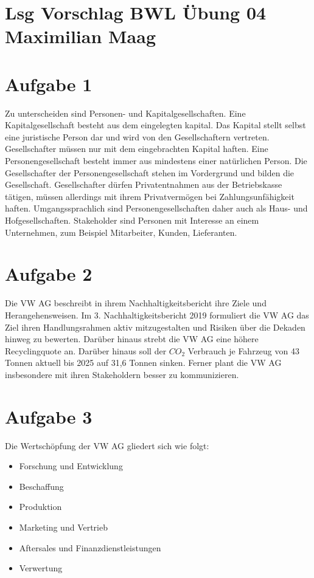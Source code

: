 \documentclass{article}
\begin{document}
	
	\section*{Lsg Vorschlag BWL Übung 04 Maximilian Maag}
	\section*{Aufgabe 1}
	Zu unterscheiden sind Personen- und Kapitalgesellschaften. Eine Kapitalgesellschaft besteht aus dem eingelegten kapital. Das Kapital stellt selbst eine juristische Person dar und wird von den Gesellschaftern vertreten. Gesellschafter müssen nur mit dem eingebrachten Kapital haften. Eine Personengesellschaft besteht immer aus mindestens einer natürlichen Person. Die Gesellschafter der Personengesellschaft stehen im Vordergrund und bilden die Gesellschaft. Gesellschafter dürfen Privatentnahmen aus der Betriebskasse tätigen, müssen allerdings mit ihrem Privatvermögen bei Zahlungsunfähigkeit haften. Umgangssprachlich sind Personengesellschaften daher auch als Haus- und Hofgesellschaften. Stakeholder sind Personen mit Interesse an einem Unternehmen, zum Beispiel Mitarbeiter, Kunden, Lieferanten.
	\section*{Aufgabe 2}
	Die VW AG beschreibt in ihrem Nachhaltigkeitsbericht ihre Ziele und Herangehensweisen. Im 3. Nachhaltigkeitsbericht 2019 formuliert die VW AG  das Ziel ihren Handlungsrahmen aktiv mitzugestalten und Risiken über die Dekaden hinweg zu bewerten. Darüber hinaus strebt die VW AG eine höhere Recyclingquote an. Darüber hinaus soll der $CO_{2}$ Verbrauch je Fahrzeug von 43 Tonnen aktuell bis 2025 auf 31,6 Tonnen sinken. Ferner plant die VW AG insbesondere mit ihren Stakeholdern besser zu kommunizieren.
	\section*{Aufgabe 3}
	Die Wertschöpfung der VW AG gliedert sich wie folgt: \\
	\begin{itemize}
		\item Forschung und Entwicklung
		\item Beschaffung
		\item Produktion
		\item Marketing und Vertrieb
		\item Aftersales und Finanzdienstleistungen
		\item Verwertung
	\end{itemize}
\end{document}
